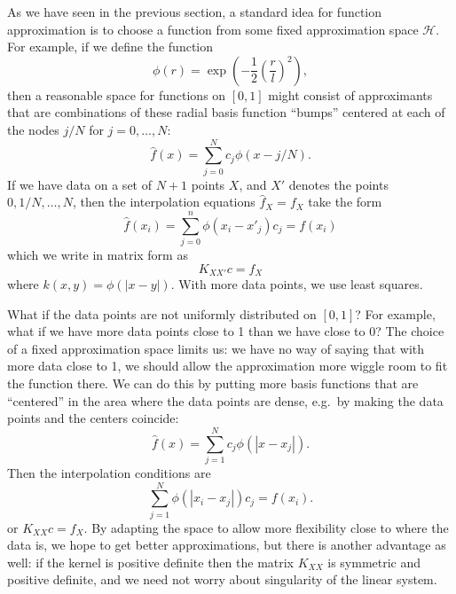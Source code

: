 \documentclass[12pt, leqno]{article} %
\begin{document}
As we have seen in the previous section, a standard idea for function
approximation is to choose a function from some fixed approximation
space $\mathcal{H}$.  For example, if we define the function
\[
  \phi(r) = \exp\left( -\frac{1}{2} \left( \frac{r}{l} \right)^2 \right),
\]
then a reasonable space for functions on $[0,1]$ might consist of
approximants that are combinations of these radial basis function
``bumps'' centered at each of the nodes $j/N$ for $j = 0, \ldots, N$:
\[
  \hat{f}(x) = \sum_{j=0}^N c_j \phi(x-j/N).
\]
If we have data on a set of $N+1$ points $X$, and $X'$ denotes the points
$0, 1/N, \ldots, N$, then the interpolation equations
$\hat{f}_X = f_X$ take the form
\[
  \hat{f}(x_i) = \sum_{j=0}^n \phi(x_i-x'_j) c_j = f(x_i)
\]
which we write in matrix form as
\[
  K_{XX'} c = f_X
\]
where $k(x,y) = \phi(|x-y|)$.  With more data points, we use least
squares.

What if the data points are not uniformly distributed on $[0,1]$?  For
example, what if we have more data points close to 1 than we have close to 0?
The choice of a fixed approximation space limits us: we have no way of
saying that with more data close to 1, we should allow the
approximation more wiggle room to fit the function there.  We can do
this by putting more basis functions that are ``centered'' in the area
where the data points are dense, e.g.~by making the data points and
the centers coincide:
\[
  \hat{f}(x) = \sum_{j=1}^N c_j \phi(|x-x_j|).
\]
Then the interpolation conditions are
\[
   \sum_{j=1}^N \phi(|x_i-x_j|) c_j = f(x_i).
\]
or $K_{XX} c = f_X$.  By adapting the space to allow more flexibility
close to where the data is, we hope to get better approximations, but
there is another advantage as well: if the kernel is positive definite
then the matrix $K_{XX}$ is symmetric and positive definite, and we
need not worry about singularity of the linear system.
\end{document}
